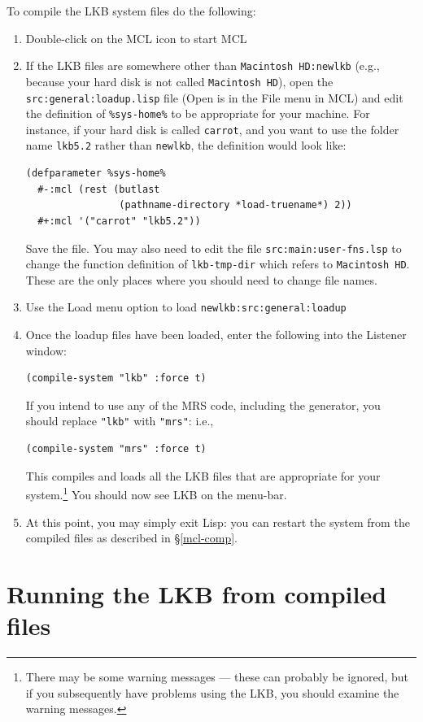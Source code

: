 \documentclass[12pt]{report}
\newcommand{\filename}[1]{{\tt #1}}
\newcommand{\functionname}[1]{{\tt #1}}
\begin{document}
To compile the LKB system files do the following:
\begin{enumerate}
\item Double-click on the MCL icon to start MCL
\item If the LKB files are somewhere other than \filename{Macintosh HD:newlkb}
(e.g., because your hard disk is not called
\filename{Macintosh HD}),
open the \filename{src:general:loadup.lisp} file (Open is in the File menu 
in MCL) and edit the definition of \verb+%sys-home%+ to be appropriate
for your machine.  For instance, if your hard disk is called \filename{carrot},
and you want to use the folder name \filename{lkb5.2}
rather than \filename{newlkb},
the definition would look like:
\begin{verbatim}
(defparameter %sys-home%
  #-:mcl (rest (butlast 
                (pathname-directory *load-truename*) 2))
  #+:mcl '("carrot" "lkb5.2"))
\end{verbatim}
Save the file.
You may also need to edit the file \filename{src:main:user-fns.lsp} to
change the function definition of \functionname{lkb-tmp-dir} which refers to
\filename{Macintosh HD}.  These are the only places where you should need to
change file names.
\item Use the Load menu option to load \filename{newlkb:src:general:loadup}
\item Once the loadup files have been loaded, enter the following into the
Listener window:
\begin{verbatim}
(compile-system "lkb" :force t)
\end{verbatim}
If you intend to use any of the MRS code, including the generator,
you should replace \verb+"lkb"+ with \verb+"mrs"+: i.e.,
\begin{verbatim}
(compile-system "mrs" :force t)
\end{verbatim}
This compiles and loads all the LKB files that are appropriate for
your system.\footnote{There may be
some warning messages --- these can probably be ignored, but if you subsequently
have problems using the LKB, you should examine the
warning messages.}
You
should now see LKB on the menu-bar.
\item
At this point, you may simply exit Lisp:
you can restart the system from the compiled files
as described in \S\ref{mcl-comp}.
\end{enumerate}


\section{Running the LKB from compiled files}
\label{compiled}
\end{document}
